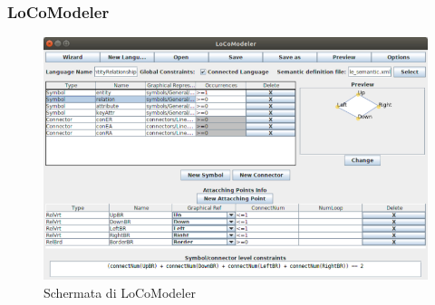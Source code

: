             \newpage

            \subsubsection{LoCoModeler}
            
                \begin{figure}[htbp]
                    \centering
                    \includegraphics[scale=1.5]{Figure/locomodeler.png}
                    \caption{Schermata di LoCoModeler}
                    \label{fig:locomodeler}
                \end{figure}

